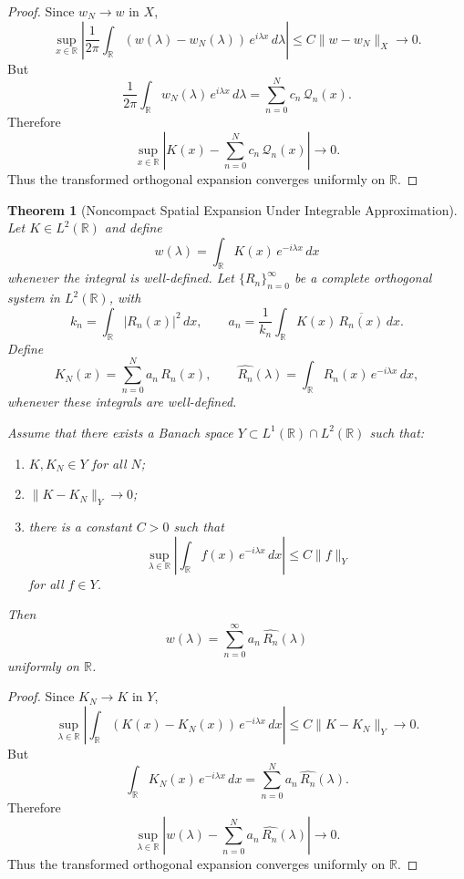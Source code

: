 \documentclass[12pt]{article}
\newtheorem{theorem}{Theorem}
\begin{document}
\begin{proof}
Since $w_N\to w$ in $X$,
\[
    \sup_{x\in\mathbb{R}}
    \left|
    \frac{1}{2\pi}\int_{\mathbb{R}} (w(\lambda)-w_N(\lambda))\,e^{i\lambda x}\,d\lambda
    \right|
    \le
    C\|w-w_N\|_X \to 0 .
\]
But
\[
    \frac{1}{2\pi}\int_{\mathbb{R}} w_N(\lambda)\,e^{i\lambda x}\,d\lambda
    =
    \sum_{n=0}^N c_n\,\mathcal{Q}_n(x) .
\]
Therefore
\[
    \sup_{x\in\mathbb{R}}
    \left|
    K(x)-\sum_{n=0}^N c_n\,\mathcal{Q}_n(x)
    \right|
    \to 0 .
\]
Thus the transformed orthogonal expansion converges uniformly on $\mathbb{R}$.
\end{proof}

\bigskip

\begin{theorem}[Noncompact Spatial Expansion Under Integrable Approximation]
Let $K \in L^2(\mathbb{R})$ and define
\begin{equation}
    w(\lambda)=\int_{\mathbb{R}} K(x)\,e^{-i\lambda x}\,dx
\end{equation}
whenever the integral is well-defined. Let $\{R_n\}_{n=0}^\infty$ be a complete orthogonal system in $L^2(\mathbb{R})$, with
\[
    k_n=\int_{\mathbb{R}} |R_n(x)|^2\,dx,
    \qquad
    a_n=\frac{1}{k_n}\int_{\mathbb{R}} K(x)\,\overline{R_n(x)}\,dx .
\]
Define
\[
    K_N(x)=\sum_{n=0}^N a_n\,R_n(x),
    \qquad
    \widehat{R_n}(\lambda)=\int_{\mathbb{R}} R_n(x)\,e^{-i\lambda x}\,dx ,
\]
whenever these integrals are well-defined.

Assume that there exists a Banach space $Y \subset L^1(\mathbb{R})\cap L^2(\mathbb{R})$ such that:
\begin{enumerate}
    \item $K,K_N \in Y$ for all $N$;
    \item $\|K-K_N\|_Y \to 0$;
    \item there is a constant $C>0$ such that
    \[
        \sup_{\lambda\in\mathbb{R}}
        \left|
        \int_{\mathbb{R}} f(x)\,e^{-i\lambda x}\,dx
        \right|
        \le C\|f\|_Y
    \]
    for all $f\in Y$.
\end{enumerate}
Then
\[
    w(\lambda)=\sum_{n=0}^\infty a_n\,\widehat{R_n}(\lambda)
\]
uniformly on $\mathbb{R}$.
\end{theorem}

\begin{proof}
Since $K_N\to K$ in $Y$,
\[
    \sup_{\lambda\in\mathbb{R}}
    \left|
    \int_{\mathbb{R}} (K(x)-K_N(x))\,e^{-i\lambda x}\,dx
    \right|
    \le
    C\|K-K_N\|_Y \to 0 .
\]
But
\[
    \int_{\mathbb{R}} K_N(x)\,e^{-i\lambda x}\,dx
    =
    \sum_{n=0}^N a_n\,\widehat{R_n}(\lambda) .
\]
Therefore
\[
    \sup_{\lambda\in\mathbb{R}}
    \left|
    w(\lambda)-\sum_{n=0}^N a_n\,\widehat{R_n}(\lambda)
    \right|
    \to 0 .
\]
Thus the transformed orthogonal expansion converges uniformly on $\mathbb{R}$.
\end{proof}
\end{document}
